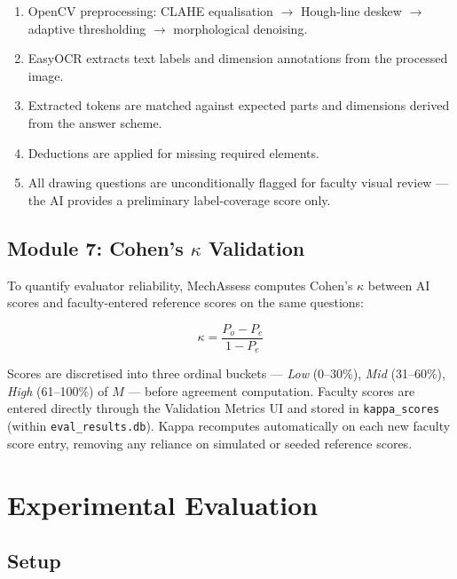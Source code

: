 \documentclass[conference]{IEEEtran}
\begin{document}
\begin{enumerate}
    \item OpenCV preprocessing: CLAHE equalisation $\rightarrow$ Hough-line deskew $\rightarrow$ adaptive thresholding $\rightarrow$ morphological denoising.
    \item EasyOCR extracts text labels and dimension annotations from the processed image.
    \item Extracted tokens are matched against expected parts and dimensions derived from the answer scheme.
    \item Deductions are applied for missing required elements.
    \item All drawing questions are unconditionally flagged for faculty visual review — the AI provides a preliminary label-coverage score only.
\end{enumerate}

\subsection{Module 7: Cohen's $\kappa$ Validation}
\label{ssec:kappa}

To quantify evaluator reliability, MechAssess computes Cohen's $\kappa$ between AI scores and faculty-entered reference scores on the same questions:

\begin{equation}
    \kappa = \frac{P_o - P_e}{1 - P_e}
    \label{eq:kappa}
\end{equation}

Scores are discretised into three ordinal buckets — \textit{Low} (0--30\%), \textit{Mid} (31--60\%), \textit{High} (61--100\%) of $M$ — before agreement computation. Faculty scores are entered directly through the Validation Metrics UI and stored in \texttt{kappa\_scores} (within \texttt{eval\_results.db}). Kappa recomputes automatically on each new faculty score entry, removing any reliance on simulated or seeded reference scores.

\section{Experimental Evaluation}
\label{sec:eval}

\subsection{Setup}
\end{document}
